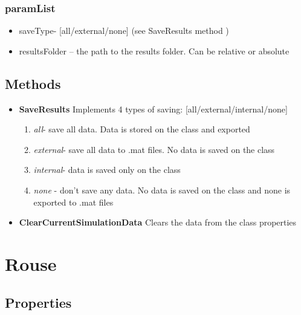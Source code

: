 \documentclass[12pt]{report}
\begin{document}
\subsubsection{paramList}
\begin{itemize}
\item{saveType}- [all/external/none] (see SaveResults method )
\item{resultsFolder} – the path to the results folder. Can be relative or absolute
\end{itemize}

\subsection{Methods}
\begin{itemize}
\item{\textbf{SaveResults}
 Implements 4 types of saving: [all/external/internal/none]
\begin{enumerate}
\item{\textit{all}}- save all data. Data is stored on the class and exported
\item{\textit{external}}- save all data to .mat files. No data is saved on the class
\item{\textit{internal}}- data is saved only on the class
\item{\textit{none}} - don't save any data. No data is saved on the class and none is exported to .mat files
\end{enumerate}}

\item{\textbf{ClearCurrentSimulationData}} Clears the data from the class properties
 \end{itemize}
 
 
\section{Rouse}\label{secRouse}

\subsection{Properties}
\end{document}
